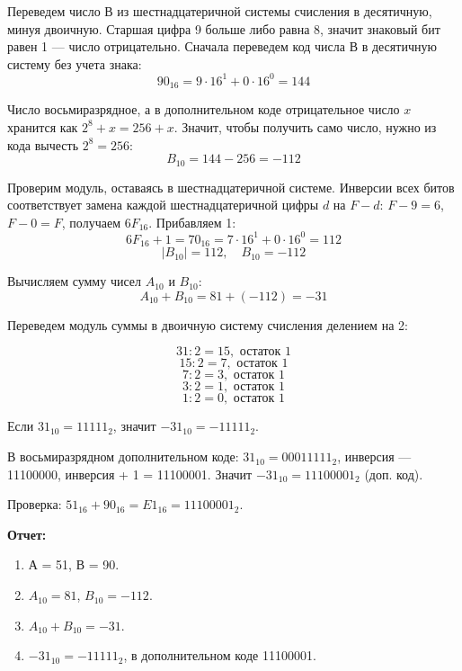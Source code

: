 \documentclass[a4paper, 12pt]{article}
\begin{document}
Переведем число В из шестнадцатеричной системы счисления в десятичную, минуя двоичную.
Старшая цифра 9 больше либо равна 8, значит знаковый бит равен 1 --- число отрицательно.
Сначала переведем код числа В в десятичную систему без учета знака:
$$90_{16} = 9 \cdot 16^1 + 0 \cdot 16^0 = 144$$

Число восьмиразрядное, а в дополнительном коде отрицательное число $x$ хранится как $2^8 + x = 256 + x$.
Значит, чтобы получить само число, нужно из кода вычесть $2^8 = 256$:
$$B_{10} = 144 - 256 = -112$$

Проверим модуль, оставаясь в шестнадцатеричной системе. Инверсии всех битов соответствует замена каждой
шестнадцатеричной цифры $d$ на $F - d$: $F - 9 = 6$, $F - 0 = F$, получаем $6F_{16}$. Прибавляем 1:
$$6F_{16} + 1 = 70_{16} = 7 \cdot 16^1 + 0 \cdot 16^0 = 112$$
$$|B_{10}| = 112, \quad B_{10} = -112$$

Вычисляем сумму чисел $A_{10}$ и $B_{10}$:
$$A_{10} + B_{10} = 81 + (-112) = -31$$

Переведем модуль суммы в двоичную систему счисления делением на 2:

$$31 : 2 = 15, \text{ остаток } 1$$
$$15 : 2 = 7, \text{ остаток } 1$$
$$7 : 2 = 3, \text{ остаток } 1$$
$$3 : 2 = 1, \text{ остаток } 1$$
$$1 : 2 = 0, \text{ остаток } 1$$

Если $31_{10} = 11111_2$, значит $-31_{10} = -11111_2$.

В восьмиразрядном дополнительном коде: $31_{10} = 00011111_2$, инверсия --- 11100000, инверсия + 1 = 11100001.
Значит $-31_{10} = 11100001_2$ (доп. код).

Проверка: $51_{16} + 90_{16} = E1_{16} = 11100001_2$.
\vspace{1cm}

\textbf{Отчет:}
\begin{enumerate}[nosep]
    \item А = 51, В = 90.
    \item $A_{10} = 81$, $B_{10} = -112$.
    \item $A_{10} + B_{10} = -31$.
    \item $-31_{10} = -11111_2$, в дополнительном коде 11100001.
\end{enumerate}
\end{document}
